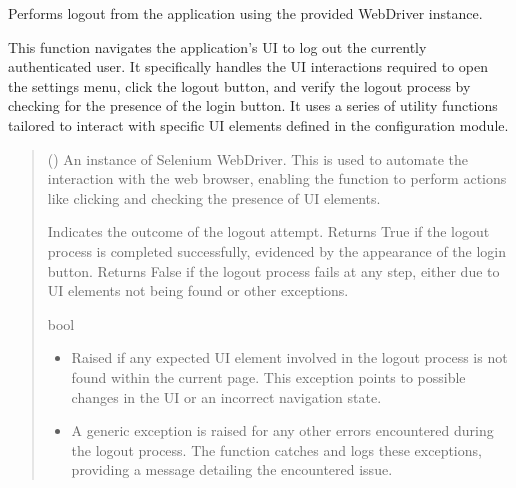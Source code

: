 \documentclass[letterpaper,10pt,english]{sphinxmanual}
\begin{document}
\begin{fulllineitems}
\label{\detokenize{tests:tests.test_logout.logout}}
\pysigstartsignatures
{}
\pysigstopsignatures
\sphinxAtStartPar
Performs logout from the application using the provided WebDriver instance.

\sphinxAtStartPar
This function navigates the application’s UI to log out the currently authenticated user. It specifically
handles the UI interactions required to open the settings menu, click the logout button, and verify the logout
process by checking for the presence of the login button. It uses a series of utility functions tailored to
interact with specific UI elements defined in the configuration module.
\begin{quote}\begin{description}
\sphinxAtStartPar
{} () \textendash{} An instance of Selenium WebDriver. This is used to automate the interaction with
the web browser, enabling the function to perform actions like clicking and checking
the presence of UI elements.

\sphinxAtStartPar
Indicates the outcome of the logout attempt. Returns True if the logout process is completed
successfully, evidenced by the appearance of the login button. Returns False if the logout
process fails at any step, either due to UI elements not being found or other exceptions.

\sphinxAtStartPar
bool

\begin{itemize}
\item {} 
\sphinxAtStartPar
{} \textendash{} Raised if any expected UI element involved in the logout process is not found
within the current page. This exception points to possible changes in the UI or
an incorrect navigation state.

\item {} 
\sphinxAtStartPar
{} \textendash{} A generic exception is raised for any other errors encountered during the logout process.
The function catches and logs these exceptions, providing a message detailing the encountered
issue.


\end{itemize}
\end{description}
\end{quote}
\end{fulllineitems}
\end{document}
